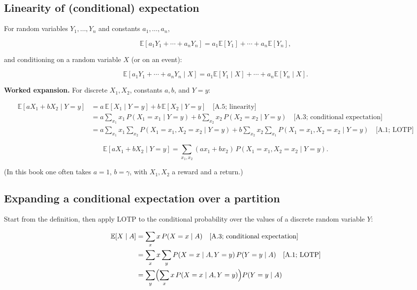 \subsection{Linearity of (conditional) expectation}

For random variables $Y_1,\ldots,Y_n$ and constants $a_1,\ldots,a_n$,

\begin{equation}
\mathbb{E}[a_1 Y_1+\cdots+a_n Y_n]
=
a_1\mathbb{E}[Y_1]+\cdots+a_n\mathbb{E}[Y_n],
\tag{A.4}
\end{equation}

and conditioning on a random variable $X$ (or on an event):

\begin{equation}
\mathbb{E}[a_1 Y_1+\cdots+a_n Y_n\mid X]
=
a_1\mathbb{E}[Y_1\mid X]+\cdots+a_n\mathbb{E}[Y_n\mid X].
\tag{A.5}
\end{equation}

\textbf{Worked expansion.} For discrete $X_1,X_2$, constants $a,b$, and $Y=y$:

\[
\begin{aligned}
\mathbb{E}[a X_1+b X_2\mid Y=y]
&=
a\,\mathbb{E}[X_1\mid Y=y]
+
b\,\mathbb{E}[X_2\mid Y=y]
\quad\text{[A.5; linearity]}
\\
&=
a\sum_{x_1} x_1\, P(X_1=x_1\mid Y=y)
+
b\sum_{x_2} x_2\, P(X_2=x_2\mid Y=y)
\quad\text{[A.3; conditional expectation]}
\\
&=
a\sum_{x_1} x_1
\sum_{x_2} P(X_1=x_1,X_2=x_2\mid Y=y)
+
b\sum_{x_2} x_2
\sum_{x_1} P(X_1=x_1,X_2=x_2\mid Y=y)
\quad\text{[A.1; LOTP]}
\end{aligned}
\]

\begin{equation}
\mathbb{E}[a X_1+b X_2\mid Y=y]
=
\sum_{x_1,x_2} (a x_1+b x_2)\, P(X_1=x_1,X_2=x_2\mid Y=y).
\tag{A.6}
\end{equation}

(In this book one often takes $a=1$, $b=\gamma$, with $X_1,X_2$ a reward and a return.)

\subsection{Expanding a conditional expectation over a partition}

Start from the definition, then apply LOTP to the conditional probability over the values of a discrete random variable $Y$:

\[
\begin{aligned}
\mathbb{E}[X\mid A]
&=
\sum_x x\, P(X=x\mid A)
\quad\text{[A.3; conditional expectation]}
\\
&=
\sum_x x
\sum_y P(X=x\mid A,Y=y)\, P(Y=y\mid A)
\quad\text{[A.1; LOTP]}
\\
&=
\sum_y
\Bigl(
\sum_x x\, P(X=x\mid A,Y=y)
\Bigr)
P(Y=y\mid A)
\end{aligned}
\]

